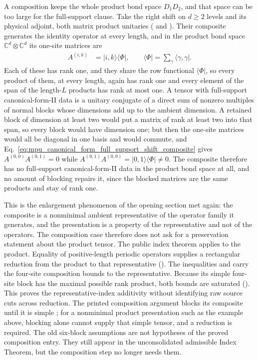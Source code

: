 \documentclass{article}
\begin{document}
A composition keeps the whole product bond space $D_1D_2$, and that space can
be too large for the full-support clause. Take the right shift on $d\geq 2$
levels and its physical adjoint, both matrix product unitaries
( and ).
Their composite generates the identity operator at every length, and in the
product bond space $\mathbb C^{d}\otimes\mathbb C^{d}$ its one-site matrices
are
\begin{align}
    A^{(i,k)} & =\lvert i,k\rangle\langle\Phi\rvert,\qquad
    \langle\Phi\rvert=\sum_{\gamma}\langle\gamma,\gamma\rvert.
    \label{eq:mpu_canonical_form_full_support_shift_composite}
\end{align}
Each of these has rank one, and they share the row functional
$\langle\Phi\rvert$, so every product of them, at every length, again has rank
one and every element of the span of the length-$L$ products has rank at most
one. A tensor with full-support canonical-form-II data is a unitary conjugate
of a direct sum of nonzero multiples of normal blocks whose dimensions add up
to the ambient dimension. A retained block of dimension at least two would put
a matrix of rank at least two into that span, so every block would have
dimension one; but then the one-site matrices would all be diagonal in one
basis and would commute, and
Eq.~\ref{eq:mpu_canonical_form_full_support_shift_composite} gives
$A^{(0,0)}A^{(0,1)}=0$ while
$A^{(0,1)}A^{(0,0)}=\lvert 0,1\rangle\langle\Phi\rvert\neq 0$.
The composite therefore has no
full-support canonical-form-II data in the product bond space at all, and no
amount of blocking repairs it, since the blocked matrices are the same
products and stay of rank one.

This is the enlargement phenomenon of the opening section met again: the
composite is a nonminimal ambient representative of the operator family it
generates, and the presentation is a property of the representative and not of
the operators. The composition case therefore does not ask for a preservation
statement about the product tensor. The public index theorem applies
 to the product.
Equality of positive-length periodic operators supplies a rectangular
reduction from the product to that representative
(). The inequalities
 and
 carry the
four-site composition bounds to the representative. Because its simple
four-site block has the maximal possible rank product, both bounds are
saturated ().
This proves the representative-index additivity without identifying raw
source cuts across reduction. The printed composition argument blocks its
composite until it is simple \cite[lines~837--841]{Cirac2017MPU}; for a
nonminimal product presentation such as the example above, blocking alone
cannot supply that simple tensor, and a reduction is required. The old
six-block assumptions are not hypotheses of the proved composition entry.
They still appear in the unconsolidated admissible Index Theorem, but the
composition step no longer needs them.
\end{document}
